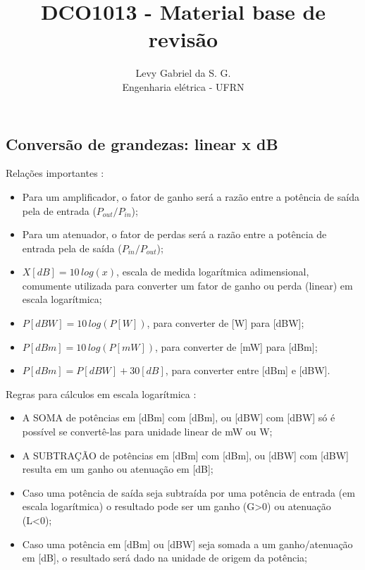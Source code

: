 \title{DCO1013 - Material base de revisão}
\author{Levy Gabriel da S. G. \\ Engenharia elétrica - UFRN}

\maketitle
\thispagestyle{fancy}

\subsection*{\textbf{Conversão de grandezas: linear x dB}}

Relações importantes \cite{ref2}:
\begin{itemize}
    \item Para um amplificador, o fator de ganho será a razão entre a potência de saída pela de entrada ($P_{out}/P_{in}$);
    \item Para um atenuador, o fator de perdas será a razão entre a potência de entrada pela de saída ($P_{in}/P_{out}$);
    \item $X[dB] = 10 \, log(x)$, escala de medida logarítmica adimensional, comumente utilizada para converter um fator de ganho ou perda (linear) em escala logarítmica;
    \item $P[dBW] = 10 \, log(P[W])$, para converter de [W] para [dBW];
    \item $P[dBm] = 10 \, log(P[mW])$, para converter de [mW] para [dBm];
    \item $P[dBm] = P[dBW] + 30 [dB]$, para converter entre [dBm] e [dBW].
\end{itemize}

Regras para cálculos em escala logarítmica \cite{ref2}:

\begin{itemize}
    \item A SOMA de potências em [dBm] com [dBm], ou [dBW] com [dBW] só é possível se convertê-las para unidade linear de mW ou W;
    \item A SUBTRAÇÃO de potências em [dBm] com [dBm], ou [dBW] com [dBW] resulta em um ganho ou atenuação em [dB];
    \item Caso uma potência de saída seja subtraída por uma potência de entrada (em escala logarítmica) o resultado pode ser um ganho (G>0) ou atenuação (L<0);
    \item Caso uma potência em [dBm] ou [dBW] seja somada a um ganho/atenuação em [dB], o resultado será dado na unidade de origem da potência;
\end{itemize}

